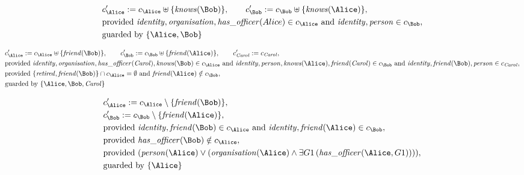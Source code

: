 \begin{align*}
&
c'_
{
\Alice
}
 := 
c_
{
\Alice
}
 \uplus 
\{
\mathit{\detokenize{
knows
}}
(
\Bob
)
\}
, \qquad 
c'_
{
\Bob
}
 := 
c_
{
\Bob
}
 \uplus 
\{
\mathit{\detokenize{
knows
}}
(
\Alice
)
\}
,\\
&
\text{provided } 
\mathit{\detokenize{
identity
}}
,
\mathit{\detokenize{
organisation
}}
,
\mathit{\detokenize{
has_officer
}}
(
Alice
)
 \in c_
{
\Alice
}
 \text{ and } 
\mathit{\detokenize{
identity
}}
,
\mathit{\detokenize{
person
}}
 \in c_
{
\Bob
}
,\\
&
\text{guarded by } \{
\Alice
,
\Bob
\}
\end{align*}

\begin{align*}
&
c'_
{
\Alice
}
 := 
c_
{
\Alice
}
 \uplus 
\{
\mathit{\detokenize{
friend
}}
(
\Bob
)
\}
, \qquad 
c'_
{
\Bob
}
 := 
c_
{
\Bob
}
 \uplus 
\{
\mathit{\detokenize{
friend
}}
(
\Alice
)
\}
, \qquad 
c'_
{
\mathit{Carol}
}
 := 
c_
{
\mathit{Carol}
}
,\\
&
\text{provided } 
\mathit{\detokenize{
identity
}}
,
\mathit{\detokenize{
organisation
}}
,
\mathit{\detokenize{
has_officer
}}
(
\mathit{Carol}
)
,
\mathit{\detokenize{
knows
}}
(
\Bob
)
 \in c_
{
\Alice
}
 \text{ and } 
\mathit{\detokenize{
identity
}}
,
\mathit{\detokenize{
person
}}
,
\mathit{\detokenize{
knows
}}
(
\Alice
)
,
\mathit{\detokenize{
friend
}}
(
\mathit{Carol}
)
 \in c_
{
\Bob
}
 \text{ and } 
\mathit{\detokenize{
identity
}}
,
\mathit{\detokenize{
friend
}}
(
\Bob
)
,
\mathit{\detokenize{
person
}}
 \in c_
{
\mathit{Carol}
}
,\\
&
\text{provided } 
\{
\mathit{\detokenize{
retired
}}
,
\mathit{\detokenize{
friend
}}
(
\Bob
)
\}
 \cap c_
{
\Alice
}
 = \emptyset
 \text{ and } 
\mathit{\detokenize{
friend
}}
(
\Alice
)
 \notin c_
{
\Bob
}
,\\
&
\text{guarded by } \{
\Alice
,
\Bob
,
\mathit{Carol}
\}
\end{align*}

\begin{align*}
&
c'_
{
\Alice
}
 := 
c_
{
\Alice
}
 \setminus 
\{
\mathit{\detokenize{
friend
}}
(
\Bob
)
\}
,\\
&
c'_
{
\Bob
}
 := 
c_
{
\Bob
}
 \setminus 
\{
\mathit{\detokenize{
friend
}}
(
\Alice
)
\}
,\\
&
\text{provided } 
\mathit{\detokenize{
identity
}}
,
\mathit{\detokenize{
friend
}}
(
\Bob
)
 \in c_
{
\Alice
}
 \text{ and } 
\mathit{\detokenize{
identity
}}
,
\mathit{\detokenize{
friend
}}
(
\Alice
)
 \in c_
{
\Bob
}
,\\
&
\text{provided } 
\mathit{\detokenize{
has_officer
}}
(
\Bob
)
 \notin c_
{
\Alice
}
,\\
&
\text{provided } 
(
\mathit{\detokenize{
person
}}
(
\Alice
)
\lor
(
\mathit{\detokenize{
organisation
}}
(
\Alice
)
\land
\exists 
G1
\,(
\mathit{\detokenize{
has_officer
}}
(
\Alice
,
G1
)
)
)
)
,\\
&
\text{guarded by } \{
\Alice
\}
\end{align*}
